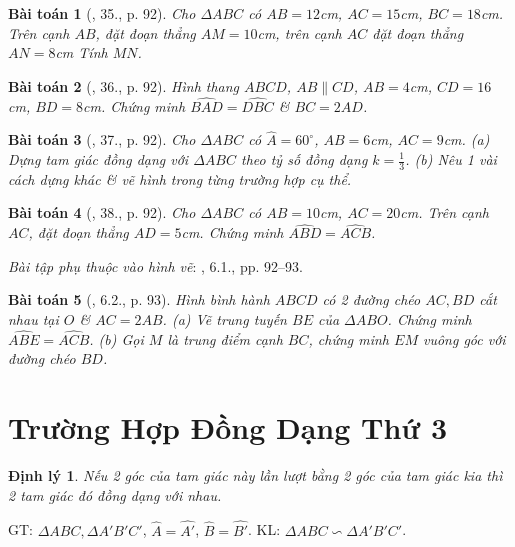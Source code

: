 \documentclass{article}
\newtheorem{baitoan}{Bài toán}
\newtheorem{dinhly}{Định lý}
\begin{document}
\begin{baitoan}[\cite{SBT_Toan_8_tap_2}, 35., p. 92]
	Cho $\Delta ABC$ có $AB = 12$\emph{cm}, $AC = 15$\emph{cm}, $BC = 18$\emph{cm}. Trên cạnh $AB$, đặt đoạn thẳng $AM = 10$\emph{cm}, trên cạnh $AC$ đặt đoạn thẳng $AN = 8$\emph{cm} Tính $MN$.
\end{baitoan}

\begin{baitoan}[\cite{SBT_Toan_8_tap_2}, 36., p. 92]
	Hình thang $ABCD$, $AB\parallel CD$, $AB = 4$\emph{cm}, $CD = 16$\emph{cm}, $BD = 8$\emph{cm}. Chứng minh $\widehat{BAD} = \widehat{DBC}$ \& $BC = 2AD$.
\end{baitoan}

\begin{baitoan}[\cite{SBT_Toan_8_tap_2}, 37., p. 92]
	Cho $\Delta ABC$ có $\widehat{A} = 60^\circ$, $AB = 6$\emph{cm}, $AC = 9$\emph{cm}. (a) Dựng tam giác đồng dạng với $\Delta ABC$ theo tỷ số đồng dạng $k = \frac{1}{3}$. (b) Nêu 1 vài cách dựng khác \& vẽ hình trong từng trường hợp cụ thể.
\end{baitoan}

\begin{baitoan}[\cite{SBT_Toan_8_tap_2}, 38., p. 92]
	Cho $\Delta ABC$ có $AB = 10$\emph{cm}, $AC = 20$\emph{cm}. Trên cạnh $AC$, đặt đoạn thẳng $AD = 5$\emph{cm}. Chứng minh $\widehat{ABD} = \widehat{ACB}$.
\end{baitoan}
\noindent\textit{Bài tập phụ thuộc vào hình vẽ}: \cite{SBT_Toan_8_tap_2}, 6.1., pp. 92--93.

\begin{baitoan}[\cite{SBT_Toan_8_tap_2}, 6.2., p. 93]
	Hình bình hành $ABCD$ có 2 đường chéo $AC,BD$ cắt nhau tại $O$ \& $AC = 2AB$. (a) Vẽ trung tuyến $BE$ của $\Delta ABO$. Chứng minh $\widehat{ABE} = \widehat{ACB}$. (b) Gọi $M$ là trung điểm cạnh $BC$, chứng minh $EM$ vuông góc với đường chéo $BD$.
\end{baitoan}


\section{Trường Hợp Đồng Dạng Thứ 3}

\begin{dinhly}
	Nếu 2 góc của tam giác này lần lượt bằng 2 góc của tam giác kia thì 2 tam giác đó đồng dạng với nhau.
\end{dinhly}
GT: $\Delta ABC,\Delta A'B'C'$, $\widehat{A} = \widehat{A'}$, $\widehat{B} = \widehat{B'}$. KL: $\Delta ABC\backsim\Delta A'B'C'$.
\end{document}
